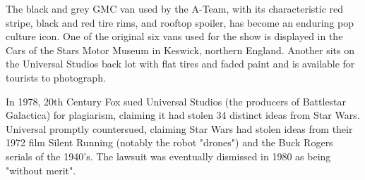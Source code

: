 The black and grey GMC van used by the A-Team, with its characteristic red stripe, black and red tire rims, and rooftop spoiler, has become an enduring pop culture icon. One of the original six vans used for the show is displayed in the Cars of the Stars Motor Museum in Keswick, northern England. Another sits on the Universal Studios back lot with flat tires and faded paint and is available for tourists to photograph.

In 1978, 20th Century Fox sued Universal Studios (the producers of Battlestar Galactica) for plagiarism, claiming it had stolen 34 distinct ideas from Star Wars. Universal promptly countersued, claiming Star Wars had stolen ideas from their 1972 film Silent Running (notably the robot "drones") and the Buck Rogers serials of the 1940's. The lawsuit was eventually dismissed in 1980 as being "without merit".
